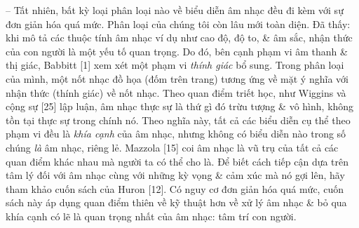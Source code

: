 \documentclass{article}
\begin{document}
\begin{itemize}
\begin{itemize}
		-- Tất nhiên, bất kỳ loại phân loại nào về biểu diễn âm nhạc đều đi kèm với sự đơn giản hóa quá mức. Phân loại của chúng tôi còn lâu mới toàn diện. Đã thấy: khi mô tả các thuộc tính âm nhạc ví dụ như cao độ, độ to, \& âm sắc, nhận thức của con người là một yếu tố quan trọng. Do đó, bên cạnh phạm vi âm thanh \& thị giác, Babbitt [1] xem xét một phạm vi {\it thính giác} bổ sung. Trong phân loại của mình, một nốt nhạc đồ họa (đốm trên trang) tương ứng về mặt ý nghĩa với nhận thức (thính giác) về nốt nhạc. Theo quan điểm triết học, như Wiggins và cộng sự [25] lập luận, âm nhạc thực sự là thứ gì đó trừu tượng \& vô hình, không tồn tại thực sự trong chính nó. Theo nghĩa này, tất cả các biểu diễn cụ thể theo phạm vi đều là {\it khía cạnh} của âm nhạc, nhưng không có biểu diễn nào trong số chúng {\it là} âm nhạc, riêng lẻ. Mazzola [15] coi âm nhạc là vũ trụ của tất cả các quan điểm khác nhau mà người ta có thể cho là. Để biết cách tiếp cận dựa trên tâm lý đối với âm nhạc cùng với những kỳ vọng \& cảm xúc mà nó gợi lên, hãy tham khảo cuốn sách của Huron [12]. Có nguy cơ đơn giản hóa quá mức, cuốn sách này áp dụng quan điểm thiên về kỹ thuật hơn về xử lý âm nhạc \& bỏ qua khía cạnh có lẽ là quan trọng nhất của âm nhạc: tâm trí con người.
		

\end{itemize}
\end{itemize}
\end{document}
